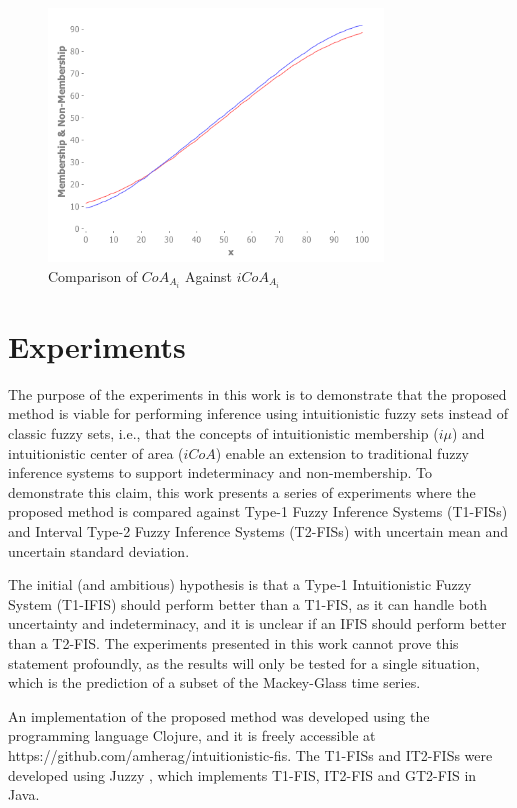\documentclass[conference]{IEEEtran}
\begin{document}
\begin{figure}[!t]
  \centering
  \includegraphics[width=3.5in]{if-coa-vs-coa}
  \caption{Comparison of $CoA_{A_{i}}$ Against $iCoA_{A_{i}}$}
  \label{if-coa-vs-coa}
\end{figure}

\section{Experiments}
\label{experiments}

The purpose of the experiments in this work is to demonstrate that the
proposed method is viable for performing inference using
intuitionistic fuzzy sets instead of classic fuzzy sets, i.e., that
the concepts of intuitionistic membership ($i\mu$) and intuitionistic
center of area ($iCoA$) enable an extension to traditional fuzzy
inference systems to support indeterminacy and non-membership. To
demonstrate this claim, this work presents a series of experiments
where the proposed method is compared against Type-1 Fuzzy Inference
Systems (T1-FISs) and Interval Type-2 Fuzzy Inference Systems
(T2-FISs) with uncertain mean and uncertain standard deviation.

The initial (and ambitious) hypothesis is that a Type-1 Intuitionistic Fuzzy System (T1-IFIS)
should perform better than a T1-FIS, as it can handle both uncertainty
and indeterminacy, and it is unclear if an IFIS should perform better
than a T2-FIS. The experiments presented in this work
cannot prove this statement profoundly, as the results will only be tested for a
single situation, which is the prediction of a subset of the
Mackey-Glass time series.

An implementation of the proposed method was developed using the
programming language Clojure, and it is freely accessible at
https://github.com/amherag/intuitionistic-fis. The T1-FISs and
IT2-FISs were developed using Juzzy \cite{wagner2013juzzy}, which
implements T1-FIS, IT2-FIS and GT2-FIS in Java.
\end{document}
